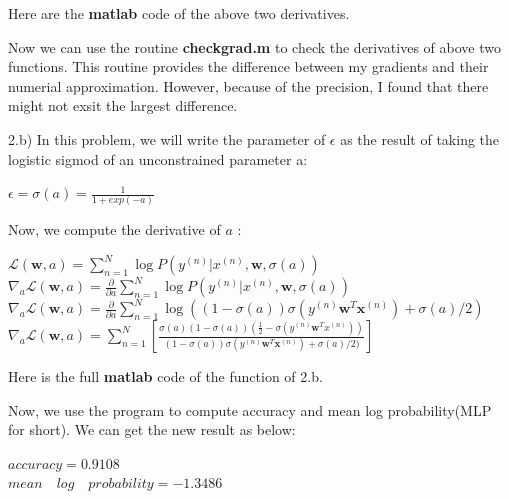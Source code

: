 \documentclass{article}
\begin{document}
Here are the \textbf{matlab} code of the above two derivatives.





Now we can use the routine \textbf{checkgrad.m} to check the derivatives of above two functions. This routine provides
the difference between my gradients and their numerial approximation. However, because of the precision, I found that there might not exsit
the largest difference.



2.b) In this problem, we will write the parameter of $\epsilon$ as the result of taking the logistic sigmod of an unconstrained parameter a:

\begin{center}
    $\epsilon = \sigma(a) = \frac{1}{1+exp(-a)}$
\end{center}

Now, we compute the derivative of $a$ :

\begin{center}
    $\mathcal{L}(\textbf{w},a) = \sum\limits_{n=1}^N \log P(y^{(n)}|x^{(n)},\textbf{w},\sigma(a))$ \\
    $\nabla_{a}\mathcal{L}(\textbf{w},a) = \frac{\partial }{\partial a} \sum\limits_{n=1}^N \log P(y^{(n)}|x^{(n)},\textbf{w},\sigma(a))$ \\
    $\nabla_{a}\mathcal{L}(\textbf{w},a) = \frac{\partial }{\partial a} \sum\limits_{n=1}^N \log ((1-\sigma(a))\sigma(y^{(n)}\textbf{w}^{T}\textbf{x}^{(n)})+\sigma(a) /2)$ \\
    $\nabla_{a}\mathcal{L}(\textbf{w},a) = \sum\limits_{n=1}^N \left[ \frac{\sigma(a)(1-\sigma(a))(\frac{1}{2}-\sigma(y^{(n)}\textbf{w}^{T}x^{(n)}))}{(1-\sigma(a))\sigma(y^{(n)}\textbf{w}^{T}\textbf{x}^{(n)})+\sigma(a) /2)}\right]$
 \end{center}

Here is the full \textbf{matlab} code of the function of 2.b.



Now, we use the program to compute accuracy and mean log probability(MLP for short). We can get the new result as below:

\begin{center}
    $accuracy = 0.9108$ \\
    $mean\quad log\quad probability = -1.3486$
\end{center}
\end{document}
